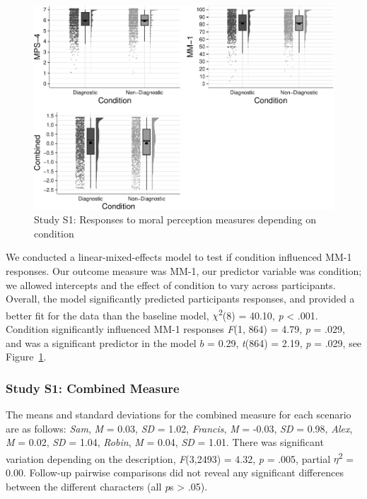 \documentclass[
  man,floatsintext]{apa6}
\begin{document}
\begin{figure}[!h]
\includegraphics[width=\textwidth,]{Supplementary_files/figure-latex/S4bothconditionplot-1} \caption{Study S1: Responses to moral perception measures depending on condition}\label{fig:S4bothconditionplot}
\end{figure}

We conducted a linear-mixed-effects model to test if condition influenced MM-1 responses. Our outcome measure was MM-1, our predictor variable was condition; we allowed intercepts and the effect of condition to vary across participants. Overall, the model significantly predicted participants responses, and provided a better fit for the data than the baseline model, \(\chi\)\textsuperscript{2}(8) = 40.10, \emph{p} \textless{} .001. Condition significantly influenced MM-1 responses \emph{F}(1, 864) = 4.79, \emph{p} = .029, and was a significant predictor in the model \(b\) = 0.29, \emph{t}(864) = 2.19, \emph{p} = .029, see Figure~\ref{fig:S4bothconditionplot}.

\subsubsection{Study S1: Combined Measure}\label{study-s1-combined-measure}

The means and standard deviations for the combined measure for each scenario are as follows:
\emph{Sam},
\emph{M} = 0.03, \emph{SD} = 1.02,
\emph{Francis},
\emph{M} = -0.03, \emph{SD} = 0.98,
\emph{Alex},
\emph{M} = 0.02, \emph{SD} = 1.04,
\emph{Robin},
\emph{M} = 0.04, \emph{SD} = 1.01. There was significant variation depending on the description, \emph{F}(3,2493) = 4.32, \emph{p} = .005, partial \(\eta\)\textsuperscript{2} = 0.00. Follow-up pairwise comparisons did not reveal any significant differences between the different characters (all \emph{p}s \textgreater{} .05).
\end{document}
